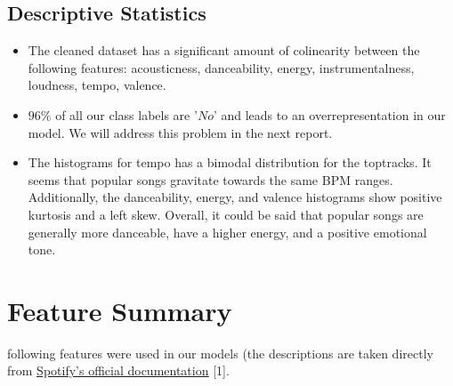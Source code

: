 \documentclass[12pt,journal]{IEEEtran}
\begin{document}
\subsection{Descriptive Statistics}
\begin{itemize}
	\item The cleaned dataset has a significant amount of colinearity between the following features: acousticness, danceability, energy, instrumentalness, loudness, tempo, valence.
	\item $96\%$ of all our class labels are '$No$' and leads to an overrepresentation in our model. We will address this problem in the next report.
	\item The histograms for tempo has a bimodal distribution for the toptracks. It seems that popular songs gravitate towards the same BPM ranges. Additionally, the danceability, energy, and valence histograms show positive kurtosis and a left skew. Overall, it could be said that popular songs are generally more danceable, have a higher energy, and a positive emotional tone.
	
\end{itemize}

\section{Feature Summary}
 following features were used in our models (the descriptions are taken directly from {\color{blue}\href{https://developer.spotify.com/documentation/web-api/reference/tracks/get-audio-features}{\underline{Spotify's official documentation}}} [1].\\
\end{document}

